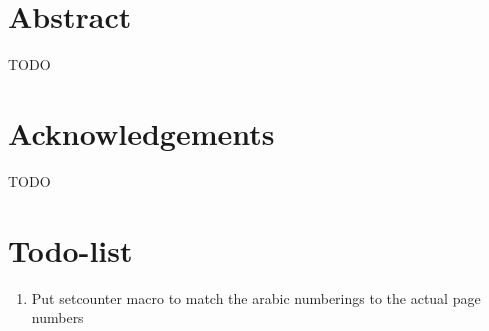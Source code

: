 \section*{Abstract}

TODO


\section*{Acknowledgements}

TODO

\section*{Todo-list}
\begin{enumerate}
    \item Put setcounter macro to match the arabic numberings to the actual page numbers
\end{enumerate}

\newpage

\tableofcontents

\newpage